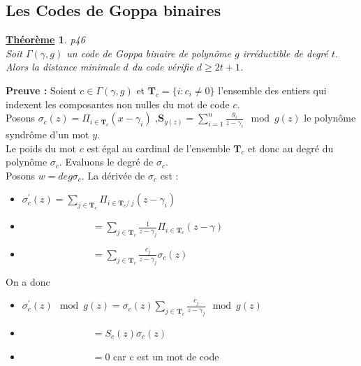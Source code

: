 \documentclass[12pt,openany]{report}
\newtheorem{theorem}{\underline{Théorème}}
\begin{document}
  \subsection{Les Codes de Goppa binaires}
  \begin{theorem}\cite{Ndollane}p46\\
  Soit $\Gamma(\gamma,g) $ un code de Goppa binaire de polynôme $g$ irréductible de degré $t$.\\ Alors la distance minimale $d$ du code vérifie $d\geq 2t +1 $.
  
  \end{theorem}
  
  
  \textbf{Preuve :}
  Soient $ c \in \Gamma(\gamma,g)$ et $\mathbf{T}_c=\lbrace i : c_i \neq 0\rbrace $ l'ensemble des entiers qui indexent les composantes non nulles du mot de code $c$.\\
  Posons $\sigma_c(z)=\Pi_{i \in \mathbf{T}_c }(x-\gamma_i) $
  ,$\mathbf{S}_{y(z)}=\sum_{i=1}^{n} \frac{y_i}{z-\gamma_i} \mod g(z)   $ le polynôme syndrôme d'un mot $y$.\\
  Le poids du mot $c$ est égal au cardinal de l'ensemble $\mathbf{T}_c$
  et donc au degré du polynôme $\sigma_c$. Evaluons le degré de $\sigma_c$.\\
  Posons $ w=deg \sigma_c $. La dérivée de $\sigma_c $ est :\\
  \begin{center}
  \begin{itemize}
  
  
 \item[] $ \sigma_c^{'}(z) = \sum_{ j \in \mathbf{T}_c} \Pi_{ i \in \mathbf{T}_c /\ j }(z-\gamma_i)$\\
  
 \item[] $\hspace{3cm} = \sum_{ j \in \mathbf{T}_c} \frac{1}{z-\gamma_j}  \Pi_{ i \in \mathbf{T}_c }(z-\gamma)$\\
 \item[] $ \hspace{3cm} = \sum_{ j \in \mathbf{T}_c} \frac{c_j}{z-\gamma_j} \sigma_c(z)$
  
  \end{itemize}
   
  \end{center}
    
    On a donc 
    \begin{center}
  \begin{itemize}
    \item[]  $ \sigma_c^{'}(z) \mod g(z) = \sigma_c(z)\sum_{ j \in \mathbf{T}_c} \frac{c_j}{z-\gamma_j}\mod g(z)  $
      
   \item[]   $ \hspace{3cm} = \mathit{S}_c(z)\sigma_c(z)  $
    \item[]  $ \hspace{3cm} = 0$ car c est un mot de code 
    
    \end{itemize}
   
  \end{center}
    
\end{document}
